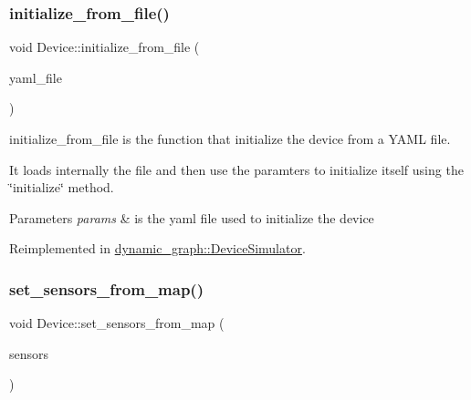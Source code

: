 \subsubsection{\texorpdfstring{initialize\+\_\+from\+\_\+file()}{initialize\_from\_file()}}
{\footnotesize\ttfamily void Device\+::initialize\+\_\+from\+\_\+file (\begin{DoxyParamCaption}\item[{const std\+::string \&}]{yaml\+\_\+file }\end{DoxyParamCaption})\hspace{0.3cm}{\ttfamily [virtual]}}



initialize\+\_\+from\+\_\+file is the function that initialize the device from a Y\+A\+ML file. 

It loads internally the file and then use the paramters to initialize itself using the \char`\"{}initialize\char`\"{} method. 
\begin{DoxyParams}{Parameters}
{\em params} & is the yaml file used to initialize the device \\
\hline
\end{DoxyParams}


Reimplemented in \hyperlink{classdynamic__graph_1_1DeviceSimulator_a8a9370f236ba03162be2472c79f865f2}{dynamic\+\_\+graph\+::\+Device\+Simulator}.

\mbox{\label{classdynamic__graph_1_1Device_ab8dc9a016ebbc34521812a27b5aa6efa}} 
\subsubsection{\texorpdfstring{set\+\_\+sensors\+\_\+from\+\_\+map()}{set\_sensors\_from\_map()}}
{\footnotesize\ttfamily void Device\+::set\+\_\+sensors\+\_\+from\+\_\+map (\begin{DoxyParamCaption}\item[{const \hyperlink{namespacedynamic__graph_abd184187f3bc15df5e227d866529e4a7}{Vector\+D\+G\+Map} \&}]{sensors }\end{DoxyParamCaption})\hspace{0.3cm}{\ttfamily [virtual]}}




